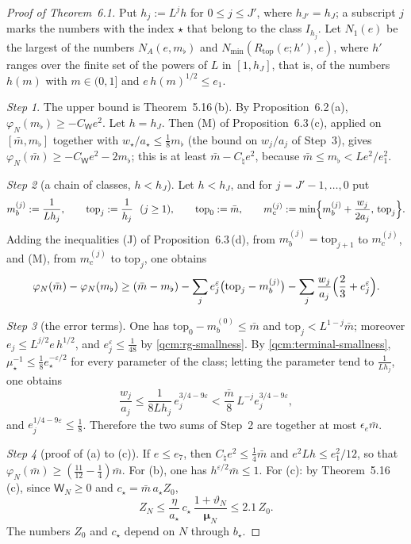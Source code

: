 \documentclass[11pt,letterpaper,reqno]{amsart}
\theoremstyle{definition}
\begin{document}
\begin{proof}[Proof of Theorem~6.1]
Put $h_j:=L^jh$ for $0\le j\le J'$, where $h_{J'}=h_J$;
a subscript $j$ marks the numbers with the index $\star$ that belong to the class $I_{h_j}$.
Let $N_1(e)$ be the largest of the numbers $N_A(e,m_\flat)$ and $N_{\min}(R_{\mathrm{top}}(e;h'),e)$, where $h'$ ranges over the finite set of the powers of $L$ in $[1,h_J]$, that is, of the numbers $h(m)$ with $m\in(0,1]$ and $e\,h(m)^{1/2}\le e_1$.

\emph{Step 1}.
The upper bound is Theorem~5.16\,(b).
By Proposition~6.2\,(a), $\varphi_N(m_\flat)\ge-C_{\mathsf W}e^2$.
Let $h=h_J$.
Then (M) of Proposition~6.3\,(c), applied on $[\bar m,m_\flat]$ together with $w_\star/a_\star\le\frac18m_\flat$ (the bound on $w_j/a_j$ of Step~3), gives $\varphi_N(\bar m)\ge-C_{\mathsf W}e^2-2m_\flat$;
this is at least $\bar m-C_\natural e^2$, because $\bar m\le m_\flat<Le^2/e_1^2$.

\emph{Step 2} (a chain of classes, $h<h_J$).
Let $h<h_J$, and for $j=J'-1,\dots,0$ put
\begin{equation*}
m_b^{(j)}:=\frac1{Lh_j},\qquad\mathrm{top}_j:=\frac1{h_j}\ \ (j\ge1),\qquad\mathrm{top}_0:=\bar m,\qquad m_c^{(j)}:=\min\Bigl\{m_b^{(j)}+\frac{w_j}{2a_j},\,\mathrm{top}_j\Bigr\}.
\end{equation*}
Adding the inequalities (J) of Proposition~6.3\,(d), from $m_b^{(j)}=\mathrm{top}_{j+1}$ to $m_c^{(j)}$, and (M), from $m_c^{(j)}$ to $\mathrm{top}_j$, one obtains
\begin{equation*}
\varphi_N(\bar m)-\varphi_N(m_\flat)\ge(\bar m-m_\flat)-\sum_je_j^\varepsilon\bigl(\mathrm{top}_j-m_b^{(j)}\bigr)-\sum_j\frac{w_j}{a_j}\Bigl(\frac23+e_j^\varepsilon\Bigr).
\end{equation*}

\emph{Step 3} (the error terms).
One has $\mathrm{top}_0-m_b^{(0)}\le\bar m$ and $\mathrm{top}_j<L^{1-j}\bar m$;
moreover $e_j\le L^{j/2}e\,h^{1/2}$, and $e_j^\varepsilon\le\frac1{48}$ by \eqref{qcm:rg-smallness}.
By \eqref{qcm:terminal-smallness}, $\mu_\star^{-1}\le\frac18e_\star^{-\varepsilon/2}$ for every parameter of the class;
letting the parameter tend to $\frac1{Lh_j}$, one obtains
\begin{equation*}
\frac{w_j}{a_j}\le\frac1{8Lh_j}\,e_j^{3/4-9\varepsilon}<\frac{\bar m}8\,L^{-j}e_j^{3/4-9\varepsilon},
\end{equation*}
and $e_j^{1/4-9\varepsilon}\le\frac18$.
Therefore the two sums of Step~2 are together at most $\epsilon_e\bar m$.

\emph{Step 4} (proof of (a) to (c)).
If $e\le e_7$, then $C_\natural e^2\le\frac14\bar m$ and $e^2Lh\le e_1^2/12$, so that $\varphi_N(\bar m)\ge(\frac{11}{12}-\frac14)\bar m$.
For (b), one has $h^{\varepsilon/2}\bar m\le1$.
For (c): by Theorem~5.16\,(c), since $\mathsf W_N\ge0$ and $c_\star=\bar m\,a_\star Z_0$,
\begin{equation*}
Z_N\le\frac\eta{a_\star}\,c_\star\,\frac{1+\vartheta_N}{\boldsymbol\mu_N}\le2.1\,Z_0 .
\end{equation*}
The numbers $Z_0$ and $c_\star$ depend on $N$ through $b_\star$.
\end{proof}
\end{document}
